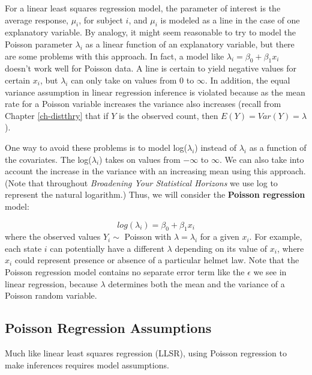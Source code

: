 \documentclass[
]{krantz}
\begin{document}
For a linear least squares regression model, the parameter of interest is the average response, \(\mu_i\), for subject \(i\), and \(\mu_i\) is modeled as a line in the case of one explanatory variable. By analogy, it might seem reasonable to try to model the Poisson parameter \(\lambda_i\) as a linear function of an explanatory variable, but there are some problems with this approach. In fact, a model like \(\lambda_i=\beta_0+\beta_1x_i\) doesn't work well for Poisson data. A line is certain to yield negative values for certain \(x_i\), but \(\lambda_i\) can only take on values from 0 to \(\infty\). In addition, the equal variance assumption in linear regression inference is violated because as the mean rate for a Poisson variable increases the variance also increases (recall from Chapter \ref{ch-distthry} that if \(Y\) is the observed count, then \(E(Y)=Var(Y)=\lambda\)).

One way to avoid these problems is to model log(\(\lambda_i\)) instead of \(\lambda_i\) as a function of the covariates. The log(\(\lambda_i\)) takes on values from \(-\infty\) to \(\infty\). We can also take into account the increase in the variance with an increasing mean using this approach. (Note that throughout \emph{Broadening Your Statistical Horizons} we use log to represent the natural logarithm.) Thus, we will consider the \textbf{Poisson regression}  model:

\begin{equation*}
log(\lambda_i)=\beta_0+\beta_1 x_i
\end{equation*}
where the observed values \(Y_i \sim\) Poisson with \(\lambda=\lambda_i\) for a given \(x_i\). For example, each state \(i\) can potentially have a different \(\lambda\) depending on its value of \(x_i\), where \(x_i\) could represent presence or absence of a particular helmet law. Note that the Poisson regression model contains no separate error term like the \(\epsilon\) we see in linear regression, because \(\lambda\) determines both the mean and the variance of a Poisson random variable.

\hypertarget{poisson-regression-assumptions}{%
\subsection{Poisson Regression Assumptions}\label{poisson-regression-assumptions}}

Much like linear least squares regression (LLSR), using Poisson regression to make inferences requires model assumptions.
\end{document}
